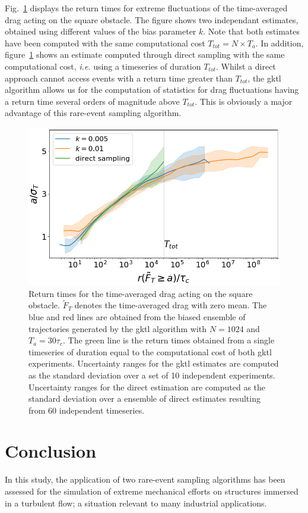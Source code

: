 \documentclass[pre,aps,floatfix,10pt,superscriptaddress, notitlepage,preprint]{revtex4-1}
\begin{document}
Fig.~\ref{fig:return_times_gktl} displays the return times for extreme fluctuations of the time-averaged drag acting on the square obstacle.
The figure shows two independant estimates, obtained using different values of the bias parameter $k$.
Note that both estimates have been computed with the same computational cost $T_{tot}=N\times T_a$.
In addition, figure~\ref{fig:return_times_gktl} shows an estimate computed through direct sampling with the same computational cost, \textit{i.e.} using a timeseries of duration $T_{tot}$.
Whilst a direct approach cannot access events with a return time greater than $T_{tot}$, the \ac{gktl} algorithm allows us for the computation of statistics for drag fluctuations having a return time several orders of magnitude above $T_{tot}$. This is  obviously a major advantage of this rare-event sampling algorithm. 

\begin{figure}
	\centering
	\includegraphics[width=.7\linewidth]{return_times_GKTL/return_times_GKTL}
	\caption{\label{fig:return_times_gktl} Return times for the time-averaged drag acting on the square obstacle. $\tilde{F}_T$ denotes the time-averaged drag with zero mean. The blue and red lines are obtained from the biased ensemble of trajectories generated by the \ac{gktl} algorithm with $N=1024$ and $T_a=30\tau_c$. The green line is the return times obtained from a single timeseries of duration equal to the computational cost of both \ac{gktl} experiments. Uncertainty ranges for the \ac{gktl} estimates are computed as the standard deviation over a set of 10 independent experiments. Uncertainty ranges for the direct estimation are computed as the standard deviation over a ensemble of direct estimates resulting from 60 independent timeseries.}
\end{figure}

\section{Conclusion}
\label{conlusion}
In this study, the application of two rare-event sampling algorithms has been assessed for the simulation of extreme mechanical efforts on structures immersed in a turbulent flow; a situation relevant to many industrial applications.
\end{document}
